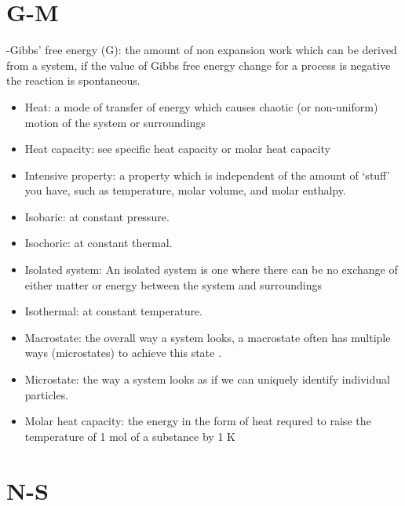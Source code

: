 \documentclass[
]{book}
\begin{document}
\hypertarget{g-m}{%
\section*{G-M}\label{g-m}}

-Gibbs' free energy (G): the amount of non expansion work which can be derived from a system, if the value of Gibbs free energy change for a process is negative the reaction is spontaneous.

\begin{itemize}
\item
  Heat: a mode of transfer of energy which causes chaotic (or non-uniform) motion of the system or surroundings
\item
  Heat capacity: see specific heat capacity or molar heat capacity
\item
  Intensive property: a property which is independent of the amount of `stuff' you have, such as temperature, molar volume, and molar enthalpy.
\item
  Isobaric: at constant pressure.
\item
  Isochoric: at constant thermal.
\item
  Isolated system: An isolated system is one where there can be no exchange of either matter or energy between the system and surroundings
\item
  Isothermal: at constant temperature.
\item
  Macrostate: the overall way a system looks, a macrostate often has multiple ways (microstates) to achieve this state .
\item
  Microstate: the way a system looks as if we can uniquely identify individual particles.
\item
  Molar heat capacity: the energy in the form of heat requred to raise the temperature of 1 mol of a substance by 1 K
\end{itemize}

\hypertarget{n-s}{%
\section*{N-S}\label{n-s}}
\end{document}
